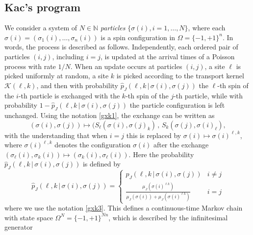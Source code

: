 \documentclass[11pt,reqno]{amsart}
\numberwithin{equation}{section}
\numberwithin{figure}{section}
\newcommand{\1}{\mathds{1}}
\newcommand{\tc}{\,|\,}
\let\si=\sigma
\let\O=\Omega
\newcommand{\cK}{\ensuremath{\mathcal K}}
\begin{document}
\subsection{Kac's program}\label{subsec:kac}
We consider a system of \(N \in \mathbb{N}\) {\em particles} \(\{\sigma(i), i = 1, \ldots, N\}\), where each \(\sigma(i)=(\si_1(i),\dots,\si_n(i))\) is a spin configuration  in \(\Omega = \{-1, +1\}^n\). 
In words, the process is described as follows. Independently, each ordered pair of particles $(i,j)$, including $i=j$, is updated at the arrival times of a Poisson process with rate $1/N$. When an update occurs at particles $(i,j)$, a site $\ell$ is picked uniformly at random,  a site $k$ is picked according to the transport kernel $\cK(\ell,k)$, and then with probability $\hat p_J(\ell,k\tc\si(i),\si(j))$ the $\ell$-th spin of the $i$-th particle is exchanged with the $k$-th spin of the $j$-th particle, 
while with probability $1- \hat p_J(\ell,k\tc\si(i),\si(j))$ the particle configuration is  left unchanged. 
Using the notation \eqref{gxk1}, the exchange can be written as
\[
(\si(i),\si(j))\mapsto (S_\ell(\sigma(i), \sigma(j)_k)\,,\,S_k(\sigma(j), \sigma(i)_\ell),
\]
with the understanding that when $i= j$ this is replaced by  $\si(i)\mapsto \si(i)^{\ell,k}$, where $\si(i)^{\ell,k}$ denotes the configuration $\si(i)$ after the exchange $(\si_\ell(i),\si_k(i))\mapsto(\si_k(i),\si_\ell(i))$. Here the probability 
 $\hat p_J(\ell,k\tc\si(i),\si(j))$ is defined by 
 \begin{equation}\label{hatp}
\hat p_J(\ell,k\tc\si(i),\si(j))= \begin{cases} p_J(\ell,k\tc\si(i),\si(j)) & i\neq j\\
 \frac{ \mu_J(\si(i)^{\ell k})}{  \mu_J(\si(i))+  \mu_J(\si(i)^{\ell k})} & i= j
\end{cases}
\end{equation}
 where we use the notation \eqref{gxk3}. %
This defines a continuous-time Markov chain with state space $\O^N=\{-1,+1\}^{Nn}$, which is described by the infinitesimal generator 
%
%
\end{document}
